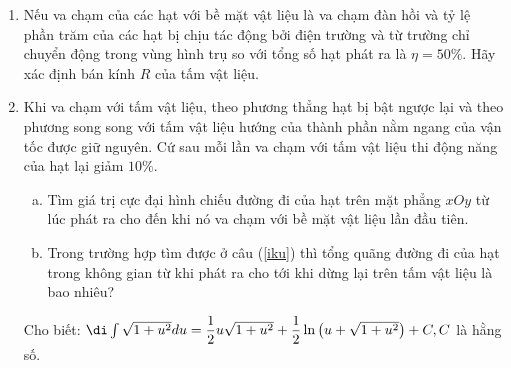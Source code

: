 \begin{vd}
\begin{center}
\end{center}
\begin{enumerate}[1)]
    \item Nếu va chạm của các hạt với bề mặt vật liệu là va chạm đàn hồi và tỷ lệ phần trăm của các hạt bị chịu tác động bởi điện trường và từ trường chỉ chuyển động trong vùng hình trụ so với tổng số hạt phát ra là $\eta=50 \%$. Hãy xác định bán kính $R$ của tấm vật liệu.
  \item Khi va chạm với tấm vật liệu, theo phương thẳng hạt bị bật ngược lại và theo phương song song với tấm vật liệu hướng của thành phần nằm ngang của vận tốc được giữ nguyên. Cứ sau mỗi lần va chạm với tấm vật liệu thi động năng của hạt lại giảm $10 \%$.
  \begin{enumerate}[a)]
      \item Tìm giá trị cực đại hình chiếu đường đi của hạt trên mặt phẳng $xOy$ từ lúc phát ra cho đến khi nó va chạm với bề mặt vật liệu lần đầu tiên. \label{iku}
    \item Trong trường hợp tìm được ở câu (\ref{iku}) thì tổng quãng đường đi của hạt trong không gian từ khi phát ra cho tới khi dừng lại trên tấm vật liệu là bao nhiêu?
  \end{enumerate}
    Cho biết: $\di\int \sqrt{1+u^{2}} d u=\dfrac{1}{2} u \sqrt{1+u^{2}}+\dfrac{1}{2} \ln \left(u+\sqrt{1+u^{2}}\right)+C, C$ là hằng số.
    

\end{enumerate}
\end{vd}
